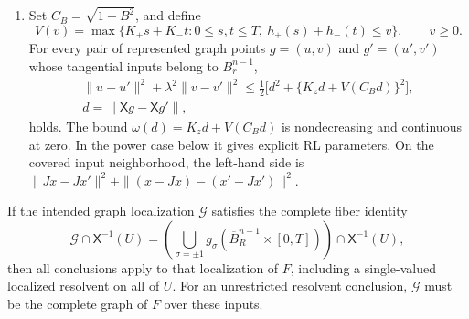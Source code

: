 \begin{theorem}
\begin{enumerate}
point, not two different solutions.
\item Set \(C_B=\sqrt{1+B^2}\), and define
\[
 V(v)=\max\{K_+s+K_-t:0\le s,t\le T,
                         \ h_+(s)+h_-(t)\le v\},\qquad v\ge0.
 \tag{S8}\label{eq:schur-allocation}
\]
For every pair of represented graph points \(g=(u,v)\) and
\(g'=(u',v')\) whose tangential inputs belong to \(B_r^{n-1}\),
\[
 \begin{gathered}
 \|u-u'\|^2+\lambda^2\|v-v'\|^2
 \le\frac12\bigl[d^2+\{K_zd+V(C_Bd)\}^2\bigr],\\
 d=\|\mathsf Xg-\mathsf Xg'\|,
 \end{gathered}
 \tag{S9}\label{eq:schur-RL-gauge}
\]
holds.  The bound \(\omega(d)=K_zd+V(C_Bd)\) is nondecreasing and
continuous at zero.  In the power case below it gives explicit RL
parameters.  On the covered input neighborhood, the left-hand side is
\(\|Jx-Jx'\|^2+\|(x-Jx)-(x'-Jx')\|^2\).
\end{enumerate}
If the intended graph localization \(\mathcal G\) satisfies the complete
fiber identity
\[
 \mathcal G\cap\mathsf X^{-1}(U)
 =\left(\bigcup_{\sigma=\pm1}
    g_\sigma(\overline B_R^{n-1}\times[0,T])\right)
      \cap\mathsf X^{-1}(U),
 \tag{S10}\label{eq:schur-complete-fibers}
\]
then all conclusions apply to that localization of \(F\), including a
single-valued localized resolvent on all of \(U\).  For an unrestricted
resolvent conclusion, \(\mathcal G\) must be the complete graph of \(F\)
over these inputs.
\end{theorem}

